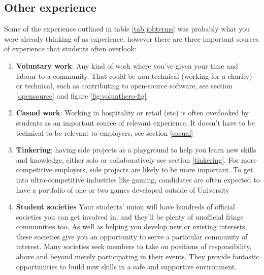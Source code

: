 \documentclass[
]{book}
\providecommand{\tightlist}{%
  \setlength{\itemsep}{0pt}\setlength{\parskip}{0pt}}
\begin{document}
\hypertarget{other}{%
\subsection{Other experience}\label{other}}

Some of the experience outlined in table \ref{tab:jobterms} was probably what you were already thinking of as experience, however there are three important sources of experience that students often overlook:

\begin{enumerate}
\def\labelenumi{\arabic{enumi}.}
\tightlist
\item
  \textbf{Voluntary work}: Any kind of work where you've given your time and labour to a community. That could be non-technical (working for a charity) or technical, such as contributing to open-source software, see section \ref{opensource} and figure \ref{fig:volunthero-fig}
\item
  \textbf{Casual work}: Working in hospitality or retail (etc) is often overlooked by students as an important source of relevant experience. It doesn't have to be technical to be relevant to employers, see section \ref{casual}
\item
  \textbf{Tinkering}: having side projects as a playground to help you learn new skills and knowledge, either solo or collaboratively see section \ref{tinkering}. For more competitive employers, side projects are likely to be more important. To get into ultra-competitive industries like gaming, candidates are often expected to have a portfolio of one or two games developed outside of University
\item
  \textbf{Student societies} Your students' union will have hundreds of official societies you can get involved in, and they'll be plenty of unofficial fringe communities too. As well as helping you develop new or existing interests, these societies give you an opportunity to serve a particular community of interest. Many societies seek members to take on positions of responsibility, above and beyond merely participating in their events. They provide fantastic opportunities to build new skills in a safe and supportive environment.
\end{enumerate}
\end{document}
